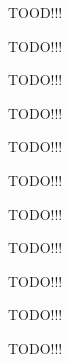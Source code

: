\documentclass[12pt]{article}					%
\begin{document}
TOOD!!!


TODO!!!

TODO!!!


TODO!!!

TODO!!!


TODO!!!

TODO!!!


TODO!!!

TODO!!!


TODO!!!

TODO!!!
\end{document}
